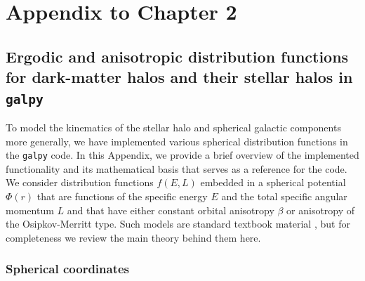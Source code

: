 \chapter{Appendix to Chapter 2}

\section{Ergodic and anisotropic distribution functions for dark-matter halos and their stellar halos in \texorpdfstring{\lowercase{\texttt{galpy}}}{galpy}}

\label{ch2:dfappendix}

To model the kinematics of the stellar halo and spherical galactic components more generally, we have implemented various spherical distribution functions in the \texttt{galpy} code. In this Appendix, we provide a brief overview of the implemented functionality and its mathematical basis that serves as a reference for the code. We consider distribution functions $f(E,L)$ embedded in a spherical potential $\Phi(r)$ that are functions of the specific energy $E$ and the total specific angular momentum $L$ and that have either constant orbital anisotropy $\beta$ or anisotropy of the Osipkov-Merritt type. Such models are standard textbook material \parencite[e.g.][]{binney08}, but for completeness we review the main theory behind them here.

\subsection{Spherical coordinates}

